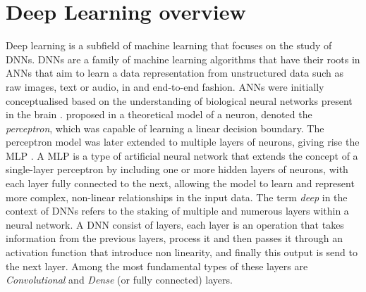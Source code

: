 
\section{Deep Learning overview}

Deep learning is a subfield of machine learning that focuses on the study of
\acp{DNN}. \acp{DNN} are a family of machine learning algorithms that have their
roots in \acp{ANN} that aim to learn a data representation from unstructured
data such as raw images, text or audio, in and end-to-end fashion. \acp{ANN}
were initially conceptualised based on the understanding of biological neural
networks present in the brain \cite{mcculloch1943logical,hebb2005organization}.
\citeauthor{rosenblatt1958perceptron} proposed in
\cite{rosenblatt1958perceptron} a theoretical model of a neuron, denoted the
\emph{perceptron}, which was capable of learning a linear decision boundary. The
perceptron model was later extended to multiple layers of neurons, giving rise
the \ac{MLP} \cite{rosenblatt1961principles,rumelhart1986learning}. A \acl{MLP}
is a type of artificial neural network that extends the concept of a
single-layer perceptron by including one or more hidden layers of neurons, with
each layer fully connected to the next, allowing the model to learn and
represent more complex, non-linear relationships in the input data. The term
\emph{deep} in the context of \acp{DNN} refers to the staking of multiple and
numerous layers within a neural network. A \ac{DNN} consist of layers, each
layer is an operation that takes information from the previous layers, process
it and then passes it through an activation function
\cite{glorot2011deep,DBLP:journals/pieee/LeCunBBH98,klambauer2017self} that
introduce non linearity, and finally this output is send to the next layer.
Among the most fundamental types of these layers are \emph{Convolutional} and
\emph{Dense} (or fully connected) layers. \\

